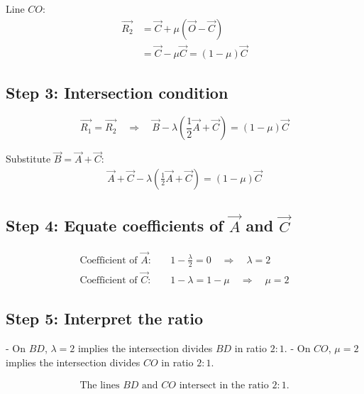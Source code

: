 \documentclass[journal]{IEEEtran}
\begin{document}
Line \(CO\):
\begin{align}
\vec{R_2} &= \vec{C} + \mu (\vec{O} - \vec{C}) \\
&= \vec{C} - \mu \vec{C} = (1-\mu)\vec{C}
\end{align}

\subsection*{Step 3: Intersection condition}

\[
\vec{R_1} = \vec{R_2} \quad \Rightarrow \quad 
\vec{B} - \lambda \left(\frac{1}{2}\vec{A} + \vec{C}\right) = (1-\mu)\vec{C}
\]

Substitute \(\vec{B} = \vec{A} + \vec{C}\):
\begin{align}
\vec{A} + \vec{C} - \lambda \left(\frac{1}{2}\vec{A} + \vec{C}\right) = (1-\mu)\vec{C}
\end{align}

\subsection*{Step 4: Equate coefficients of \(\vec{A}\) and \(\vec{C}\)}
\begin{align}
\text{Coefficient of } \vec{A}: & \quad 1 - \frac{\lambda}{2} = 0 \quad \Rightarrow \quad \lambda = 2 \\
\text{Coefficient of } \vec{C}: & \quad 1 - \lambda = 1 - \mu \quad \Rightarrow \quad \mu = 2
\end{align}

\subsection*{Step 5: Interpret the ratio}

- On \(BD\), \(\lambda = 2\) implies the intersection divides \(BD\) in ratio \(2:1\).  
- On \(CO\), \(\mu = 2\) implies the intersection divides \(CO\) in ratio \(2:1\).  

\begin{align}
\boxed{\text{The lines $BD$ and $CO$ intersect in the ratio } 2:1.}
\end{align}
\end{document}
